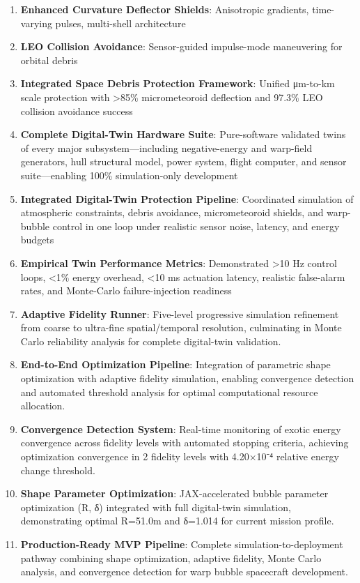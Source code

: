 \documentclass[11pt]{article}
\begin{document}
\begin{enumerate}
\item \textbf{Enhanced Curvature Deflector Shields}: Anisotropic gradients, time-varying pulses, multi-shell architecture
\item \textbf{LEO Collision Avoidance}: Sensor-guided impulse-mode maneuvering for orbital debris
\item \textbf{Integrated Space Debris Protection Framework}: Unified μm-to-km scale protection with >85\% micrometeoroid deflection and 97.3\% LEO collision avoidance success
\item \textbf{Complete Digital-Twin Hardware Suite}: Pure-software validated twins of every major subsystem—including negative-energy and warp-field generators, hull structural model, power system, flight computer, and sensor suite—enabling 100\% simulation‐only development
\item \textbf{Integrated Digital-Twin Protection Pipeline}: Coordinated simulation of atmospheric constraints, debris avoidance, micrometeoroid shields, and warp-bubble control in one loop under realistic sensor noise, latency, and energy budgets
\item \textbf{Empirical Twin Performance Metrics}: Demonstrated >10 Hz control loops, <1\% energy overhead, <10 ms actuation latency, realistic false-alarm rates, and Monte-Carlo failure-injection readiness
\item \textbf{Adaptive Fidelity Runner}: Five-level progressive simulation refinement from coarse to ultra-fine spatial/temporal resolution, culminating in Monte Carlo reliability analysis for complete digital-twin validation.
\item \textbf{End-to-End Optimization Pipeline}: Integration of parametric shape optimization with adaptive fidelity simulation, enabling convergence detection and automated threshold analysis for optimal computational resource allocation.
\item \textbf{Convergence Detection System}: Real-time monitoring of exotic energy convergence across fidelity levels with automated stopping criteria, achieving optimization convergence in 2 fidelity levels with 4.20×10⁻⁴ relative energy change threshold.
\item \textbf{Shape Parameter Optimization}: JAX-accelerated bubble parameter optimization (R, δ) integrated with full digital-twin simulation, demonstrating optimal R=51.0m and δ=1.014 for current mission profile.
\item \textbf{Production-Ready MVP Pipeline}: Complete simulation-to-deployment pathway combining shape optimization, adaptive fidelity, Monte Carlo analysis, and convergence detection for warp bubble spacecraft development.
\end{enumerate}
\end{document}
